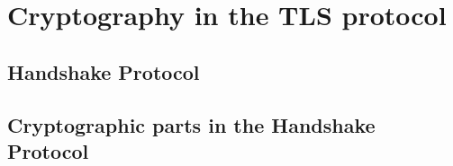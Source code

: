 \chapter{Cryptography in the TLS protocol}

\section{Handshake Protocol}


\section{Cryptographic parts in the Handshake Protocol}